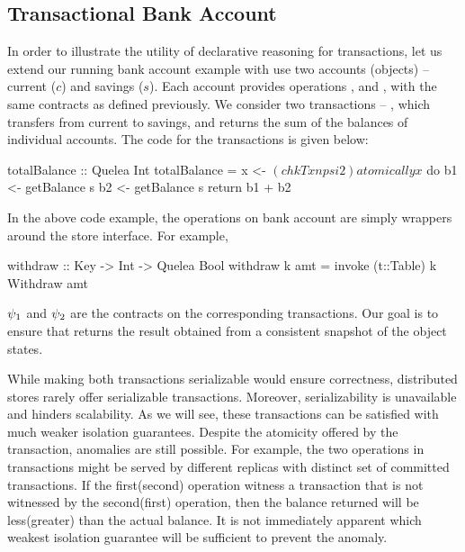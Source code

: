 \subsection{Transactional Bank Account}

In order to illustrate the utility of declarative reasoning for transactions,
let us extend our running bank account example with use two accounts (objects)
-- current ($c$) and savings ($s$). Each account provides operations
,  and , with the same contracts as
defined previously. We consider two transactions -- , which
transfers  from current to savings, and  returns the
sum of the balances of individual accounts. The \name code for the transactions
is given below:
\vspace{-1em}

\noindent \begin{minipage}[t]{0.5\columnwidth}
\end{minipage}
\begin{minipage}[t]{0.5\columnwidth}
\begin{codehaskell}
totalBalance :: Quelea Int
totalBalance =
  x <- $(chkTxn psi2)
  atomically x $ do
    b1 <- getBalance s
    b2 <- getBalance s
    return b1 + b2
\end{codehaskell}
\end{minipage}

\noindent In the above code example, the operations on bank account are simply
wrappers around the store interface. For example,

\begin{codehaskell}
withdraw :: Key -> Int -> Quelea Bool
withdraw k amt = invoke (t::Table) k Withdraw amt
\end{codehaskell}

\noindent $\psi_1$ and $\psi_2$ are the contracts on the corresponding
transactions. Our goal is to ensure that  returns the result
obtained from a consistent snapshot of the object states.

While making both transactions serializable would ensure correctness,
distributed stores rarely offer serializable transactions. Moreover,
serializability is unavailable and hinders scalability. As we will see, these
transactions can be satisfied with much weaker isolation guarantees. Despite
the atomicity offered by the transaction, anomalies are still possible. For
example, the two  operations in  transactions
might be served by different replicas with distinct set of committed 
transactions. If the first(second)  operation witness a
 transaction that is not witnessed by the second(first)
 operation, then the balance returned will be less(greater) than
the actual balance. It is not immediately apparent which weakest isolation
guarantee will be sufficient to prevent the anomaly.

